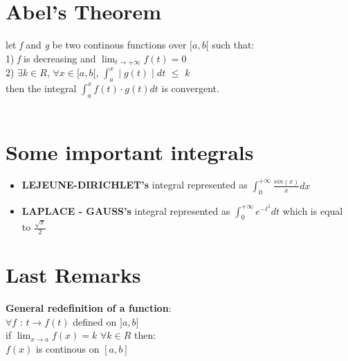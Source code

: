 \documentclass{article}
\begin{document}
\section{Abel's Theorem}
let \textit{f} and \textit{g} be two continous functions over $[a, b[$ such that:\\
1) \textit{f} is decreasing and $\lim_{t \to +\infty} f(t) = 0$\\
2) $\exists k \in R$, $\forall x \in [ a, b [$, $\int_{a}^{x} \mid g(t) \mid dt $ $\leq$ $k$\\
then the integral $\int_{a}^{x} f(t) \cdot g(t) dt$ is convergent.\\
\\
\section{Some important integrals}
\begin{itemize}
    \item \textbf{LEJEUNE-DIRICHLET's} integral represented as $\int_{0}^{+\infty} \frac{sin(x)}{x} dx$
    \item \textbf{LAPLACE - GAUSS's} integral represented as $\int_{0}^{+\infty} e^{-t^{2}} dt$ which is equal to $\frac{\sqrt{\pi}}{2}$
\end{itemize}
\section{Last Remarks}
\textbf{General redefinition of a function}: \\
$\forall f$ : $t \rightarrow f(t)$ defined on $] a, b ]$\\
if $\lim_{x \to a} f(x) = k$ $\forall k \in R$ then:\\
$f(x)$ is continous on $[ a, b ]$
\end{document}

